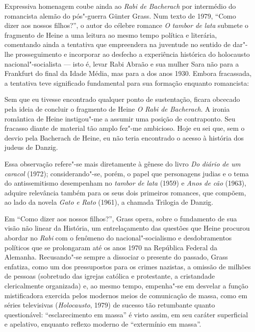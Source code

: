 Expressiva homenagem coube ainda ao \textit{Rabi de Bacherach} por
intermédio do romancista alemão do pós"-guerra Günter Grass. Num texto
de 1979, “Como dizer aos nossos filhos?”, o autor do célebre romance
\textit{O tambor de lata} submete o fragmento de Heine a uma leitura ao
mesmo tempo política e literária, comentando ainda a tentativa que
empreendera na juventude no sentido de dar"-lhe prosseguimento e
incorporar ao desfecho a experiência histórica do holocausto
nacional"-socialista --- isto é, levar Rabi Abraão e sua mulher Sara não
para a Frankfurt do final da Idade Média, mas para a dos anos 1930.
Embora fracassada, a tentativa teve significado
fundamental para sua formação enquanto romancista: 

\begin{hedraquote}
Sem que eu tivesse encontrado qualquer ponto de sustentação, ficara 
obcecado pela ideia de concluir o fragmento de Heine \textit{O Rabi de Bacherach}. A ironia
romântica de Heine instigou"-me a assumir uma posição de contraponto.
Seu fracasso diante de material tão amplo fez"-me ambicioso. Hoje eu
sei que, sem o desvio pela Bacherach de Heine, eu não teria encontrado
o acesso à história dos judeus de Danzig. 
\end{hedraquote}

Essa observação refere"-se
mais diretamente à gênese do livro \textit{Do diário de um caracol}
(1972); considerando"-se, porém, o papel que personagens judias e o
tema do antissemitismo desempenham no \textit{tambor de lata} (1959)
e \textit{Anos de cão} (1963), adquire relevância também para os seus
dois primeiros romances, que compõem, ao lado da novela \textit{Gato e
Rato }(1961), a chamada Trilogia de Danzig.

Em “Como dizer aos nossos filhos?”, Grass opera, sobre o fundamento de
sua visão não linear da História, um entrelaçamento das questões que
Heine procurou abordar no \textit{Rabi }com o fenômeno do
nacional"-socialismo e desdobramentos políticos que se prolongaram até
os anos 1970 na República Federal da Alemanha. Recusando"-se sempre a
dissociar o presente do passado, Grass enfatiza, como um dos
pressupostos para os crimes nazistas, a omissão de milhões de pessoas
(sobretudo das igrejas católica e protestante, a cristandade
clericalmente organizada) e, ao mesmo tempo, empenha"-se em desvelar a
função mistificadora exercida pelos modernos meios de comunicação de
massa, como em séries televisivas (\textit{Holocausto}, 1979) de
sucesso tão retumbante quanto questionável: “esclarecimento em massa” é
visto assim, em seu caráter superficial e apelativo, enquanto reflexo
moderno de “extermínio em massa”.

